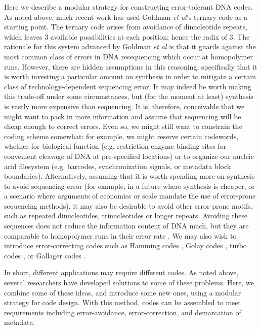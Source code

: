 \documentclass[english]{article}
\begin{document}
Here we describe a modular strategy for constructing error-tolerant DNA codes.
As noted above, much recent work has used Goldman {\em et al}'s ternary code as a starting point.
The ternary code arises from avoidance of dinucleotide repeats, which leaves 3 available possibilities at each position; hence the radix of 3.
The rationale for this system advanced by Goldman {\em et al} is that it guards against the most common class of errors in DNA resequencing which occur at homopolymer runs.
However, there are hidden assumptions in this reasoning, specifically that it is worth investing a particular amount on synthesis
in order to mitigate a certain class of technology-dependent sequencing error.
It may indeed be worth making this trade-off under some circumstances, but (for the moment at least) synthesis is vastly more expensive than sequencing.
It is, therefore, conceivable that we might want to pack in more information and assume that sequencing will be cheap enough to correct errors.
Even so, we might still want to constrain the coding scheme somewhat: for example, we might reserve certain codewords,
whether for biological function (e.g. restriction enzyme binding sites for convenient cleavage of DNA at pre-specified locations)
or to organize our nucleic acid filesystem (e.g. barcodes, synchronization signals, or metadata block boundaries).
Alternatively, assuming that it is worth spending more on synthesis to avoid sequencing error
(for example, in a future where synthesis is cheaper, or a scenario where arguments of economics or scale mandate the use of error-prone sequencing methods),
it may also be desirable to avoid other error-prone motifs, such as repeated dinucleotides, trinucleotides or longer repeats.
Avoiding these sequences does not reduce the information content of DNA much, but they are comparable to homopolymer runs in their error rate \cite{LaehnemannEtAl2016}.
We may also wish to introduce error-correcting codes such as Hamming codes \cite{Mackay2003}, Golay codes \cite{GuptaEtAl2015},
turbo codes \cite{FreyMackay98,MurphyEtAl1999}, or Gallager codes \cite{Mackay1997}.

In short, different applications may require different codes.
As noted above, several researchers have developed solutions to some of these problems.
Here, we combine some of these ideas, and introduce some new ones, using a modular strategy for code design.
With this method, codes can be assembled to meet requirements
including error-avoidance, error-correction, and demarcation of metadata.
\end{document}
